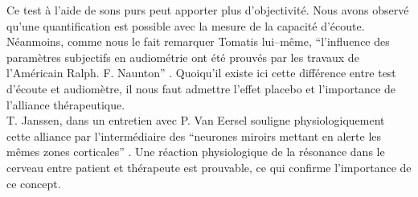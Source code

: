 \begin{itemize}
  	  
  	 Ce test à l'aide de sons purs peut apporter plus d'objectivité. Nous avons observé qu'une 
  		quantification est possible avec la mesure de la capacité d'écoute.
  		Néanmoins, comme nous le fait 
  		remarquer 
  Tomatis lui--même,
  \enquote{l'influence des paramètres subjectifs en audiométrie ont été prouvés par les travaux de 
  	l'Américain Ralph. F. Naunton}  \autocite [69]{tomatisoreilletvie}. Quoiqu'il existe ici cette différence 
  entre 
  test d'écoute et audiomètre, il nous faut admettre l'effet placebo et l'importance de l'alliance 
  thérapeutique.
   \\
  T. Janssen, dans un entretien
  avec P. Van Eersel
  souligne physiologiquement cette alliance 
  par l'intermédiaire des ``{neurones
  	miroirs mettant en alerte les mêmes zones corticales}'' \autocite[203]{van_eersel_cerveau}.
  Une réaction physiologique de la résonance dans le cerveau entre patient et thérapeute est prouvable, 
  ce qui confirme 
  l'importance 
  de ce concept. 
   
  
 
  	 
 
 
 

\end{itemize}
